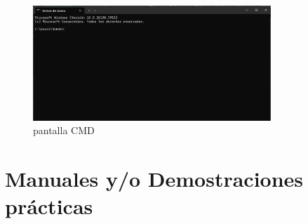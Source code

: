 \begin{figure}[h]
    \centering
    \includegraphics[width=0.8\textwidth]{img/pantalla CMD.png}
    \caption{pantalla CMD}
    \label{fig:CMD}
\end{figure}
\section{Manuales y/o Demostraciones prácticas}




    
     